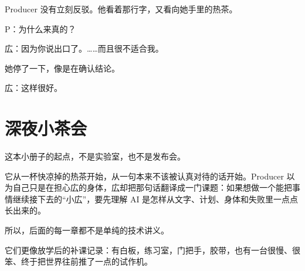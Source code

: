 Producer 没有立刻反驳。他看着那行字，又看向她手里的热茶。

P：为什么来真的？

広：因为你说出口了。……而且很不适合我。

她停了一下，像是在确认结论。

広：这样很好。

\clearpage

\section{深夜小茶会}

这本小册子的起点，不是实验室，也不是发布会。

它从一杯快凉掉的热茶开始，从一句本来不该被认真对待的话开始。Producer 以为自己只是在担心広的身体，広却把那句话翻译成一门课题：如果想做一个能把事情继续接下去的“小広”，要先理解 AI 是怎样从文字、计划、身体和失败里一点点长出来的。

所以，后面的每一章都不是单纯的技术讲义。

它们更像放学后的补课记录：有白板，练习室，门把手，胶带，也有一台很慢、很笨、终于把世界往前推了一点的试作机。
